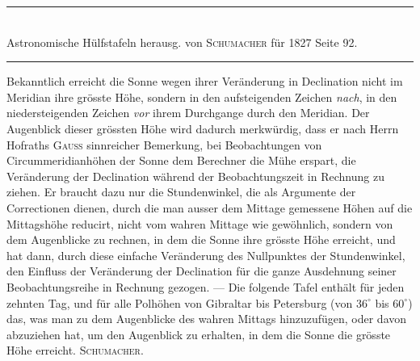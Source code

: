 \begin{center}
\rule{0.55\linewidth}{0.4pt}\\[2pt]
Astronomische Hülfstafeln herausg. von \textsc{Schumacher} für 1827 Seite 92.\\[2pt]
\rule{0.55\linewidth}{0.4pt}
\end{center}

Bekanntlich erreicht die Sonne wegen ihrer Veränderung in Declination nicht im Meridian ihre grösste Höhe, sondern in den aufsteigenden Zeichen \emph{nach}, in den niedersteigenden Zeichen \emph{vor} ihrem Durchgange durch den Meridian. Der Augenblick dieser grössten Höhe wird dadurch merkwürdig, dass er nach Herrn Hofraths \textsc{Gauss} sinnreicher Bemerkung, bei Beobachtungen von Circummeridianhöhen
der Sonne dem Berechner die Mühe erspart, die Veränderung der Declination während der Beobachtungszeit in Rechnung zu ziehen. Er braucht dazu nur die Stundenwinkel, die als Argumente der Correctionen dienen, durch die man ausser dem Mittage gemessene Höhen auf die Mittagshöhe reducirt, nicht vom wahren Mittage wie gewöhnlich, sondern von dem Augenblicke zu rechnen, in dem die Sonne ihre grösste Höhe erreicht, und hat dann, durch diese einfache Veränderung des Nullpunktes der Stundenwinkel, den Einfluss der Veränderung der Declination für die ganze Ausdehnung seiner Beobachtungsreihe in Rechnung gezogen. --- Die folgende Tafel enthält für jeden zehnten Tag, und für alle Polhöhen von Gibraltar bis Petersburg (von $36^\circ$ bis $60^\circ$) das, was man zu dem Augenblicke des wahren Mittags hinzuzufügen, oder davon abzuziehen hat, um den Augenblick zu erhalten, in dem die Sonne die grösste Höhe erreicht. \textsc{Schumacher.}
